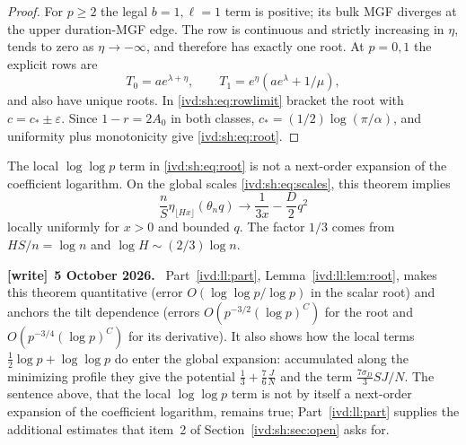 \documentclass[11pt,letterpaper]{article}
\theoremstyle{remark}\newtheorem{remark}[theorem]{Remark}
\numberwithin{equation}{section}
\newenvironment{writenote}[1][]{\par\smallskip\begingroup\small
 \noindent\textbf{[write]}\if\relax\detokenize{#1}\relax\else~\textbf{#1.}\fi\ }%
 {\par\endgroup\smallskip}
\begin{document}
\begin{proof}
For $p\ge2$ the legal $b=1,\ell=1$ term is positive; its bulk MGF
diverges at the upper duration-MGF edge. The row is continuous and
strictly increasing in $\eta$, tends to zero as $\eta\to-\infty$,
and therefore has exactly one root. At $p=0,1$ the explicit rows are
\[
 T_0=ae^{\lambda+\eta},\qquad
 T_1=e^\eta(ae^\lambda+1/\mu),
\]
and also have unique roots. In \eqref{ivd:sh:eq:rowlimit} bracket the root
with $c=c_*\pm\varepsilon$. Since $1-r=2A_0$ in both classes,
$c_*=(1/2)\log(\pi/\alpha)$, and uniformity plus monotonicity give
\eqref{ivd:sh:eq:root}.
\end{proof}
The local $\log\log p$ term in \eqref{ivd:sh:eq:root} is not a
next-order expansion of the coefficient logarithm. On the global
scales \eqref{ivd:sh:eq:scales}, this theorem implies
\begin{equation}\label{ivd:sh:eq:scaledroot}
 \frac nS\eta_{\lfloor Hx\rfloor}(\theta_n q)
   \longrightarrow\frac1{3x}-\frac D2q^2
\end{equation}
locally uniformly for $x>0$ and bounded $q$. The factor $1/3$
comes from $HS/n=\log n$ and $\log H\sim(2/3)\log n$.
\begin{writenote}[5 October 2026]
Part~\ref{ivd:ll:part}, Lemma~\ref{ivd:ll:lem:root}, makes this theorem quantitative (error $O(\log\log p/\log p)$ in the scalar root) and anchors the tilt dependence (errors $O(p^{-3/2}(\log p)^C)$ for the root and $O(p^{-3/4}(\log p)^C)$ for its derivative). It also shows how the local terms $\frac12\log p+\log\log p$ do enter the global expansion: accumulated along the minimizing profile they give the potential $\frac13+\frac76\frac JN$ and the term $\frac{7\sigma_D}3SJ/N$. The sentence above, that the local $\log\log p$ term is not by itself a next-order expansion of the coefficient logarithm, remains true; Part~\ref{ivd:ll:part} supplies the additional estimates that item~2 of Section~\ref{ivd:sh:sec:open} asks for.
\end{writenote}
\end{document}
